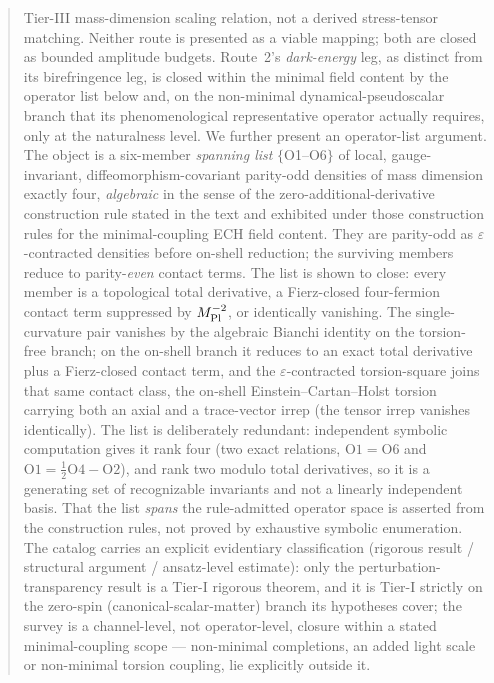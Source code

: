 \documentclass[aps,prd,twocolumn,superscriptaddress,showpacs,preprintnumbers,nofootinbib,longbibliography,floatfix]{revtex4-2}
\newcommand{\MPl}{M_{\rm Pl}}
\begin{document}
\begin{abstract}
Tier-III mass-dimension scaling relation, not a derived stress-tensor
matching. Neither route is presented as a viable mapping; both
are closed as bounded amplitude budgets. Route~2's \emph{dark-energy}
leg, as distinct from its birefringence leg, is closed within the minimal
field content by the operator list below and, on the non-minimal
dynamical-pseudoscalar branch that its phenomenological representative
operator actually requires, only at the naturalness level. We further present
an operator-list argument. The object is a six-member \emph{spanning
list} $\{$O1--O6$\}$ of local,
gauge-invariant, diffeomorphism-covariant parity-odd densities of mass
dimension exactly four, \emph{algebraic} in the sense of the
zero-additional-derivative construction rule stated in the text and
exhibited under those construction rules for the
minimal-coupling ECH field content. They are parity-odd as
$\varepsilon$-contracted densities before on-shell reduction; the
surviving members reduce to parity-\emph{even} contact terms.
The list is shown to close: every member is
a topological total derivative, a Fierz-closed four-fermion contact term
suppressed by $\MPl^{-2}$, or identically vanishing. The single-curvature
pair vanishes by the algebraic Bianchi identity on the torsion-free
branch; on the on-shell branch it reduces to an exact total derivative
plus a Fierz-closed contact term, and the $\varepsilon$-contracted
torsion-square joins that same contact class, the on-shell
Einstein--Cartan--Holst torsion carrying both an axial and a trace-vector
irrep (the tensor irrep vanishes identically). The list
is deliberately redundant: independent symbolic computation gives it rank
four (two exact relations, $\mathrm{O1}=\mathrm{O6}$ and
$\mathrm{O1}=\tfrac12\mathrm{O4}-\mathrm{O2}$), and rank two modulo total
derivatives, so it is a generating set of recognizable invariants and not
a linearly independent basis. That the list \emph{spans} the
rule-admitted operator space is asserted from the construction rules, not
proved by exhaustive symbolic enumeration. The
catalog carries an explicit evidentiary classification (rigorous result /
structural argument / ansatz-level estimate): only the
perturbation-transparency result is a Tier-I rigorous theorem, and it is
Tier-I strictly on the zero-spin (canonical-scalar-matter) branch its
hypotheses cover; the
survey is a channel-level, not operator-level, closure within a stated
minimal-coupling scope --- non-minimal completions, an added light scale
or non-minimal torsion coupling, lie explicitly outside it.
\end{abstract}
\end{document}
